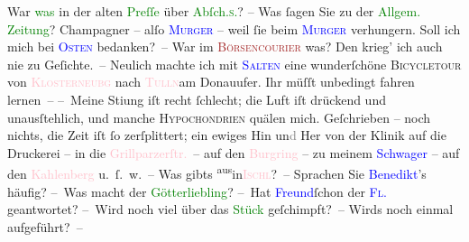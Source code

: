            \pstart
           War \textcolor{green}{was}{} in der alten \textcolor{green}{Preſſe}{}\ledrightnote{\textcolor{green}{Die Presse}} über \textcolor{green}{Abſch.\textsc{s}.}{}\ledrightnote{\textcolor{green}{Abschiedssouper}}? – Was ſagen Sie zu der \textcolor{green}{\textcolor{green}{Allgem. Zeitung}{}\ledrightnote{\textcolor{green}{Wiener Allgemeine Zeitung}}}{}? Champagner – alſo \textcolor{blue}{\textsc{Murger}}{}\ledrightnote{\textcolor{blue}{Henri Murger}} – weil ſie beim \textcolor{blue}{\textsc{Murger}}{}\ledrightnote{\textcolor{blue}{Henri Murger}} verhungern. Soll ich mich bei \textcolor{blue}{\textsc{Osten}}{}\ledrightnote{\textcolor{blue}{Heinrich Osten}} bedanken? – War im \textcolor{brown}{\textsc{Börsencourier}}{}\ledrightnote{\textcolor{brown}{Berliner Börsen-Courier}} was? Den krieg’ ich auch nie zu Geſichte. –\pend
           \pstart
           Neulich machte ich mit \textcolor{blue}{\textsc{Salten}}{}\ledrightnote{\textcolor{blue}{Felix Salten}} eine wunderſchöne \textsc{Bicycletour} von \textcolor{pink}{\textsc{Klosterneubg}}{}\ledrightnote{\textcolor{pink}{Klosterneuburg}} nach \textcolor{pink}{\textsc{Tulln}}{}\ledrightnote{\textcolor{pink}{Tulln an der Donau}}{ }{\pb}am Donauufer. Ihr
               müſſt unbedingt fahren lernen –\pend
           \pstart
           – Meine Sti{\geminationm}ung iſt recht ſchlecht; die Luft iſt
               drückend und unausſtehlich, und manche \textsc{Hypochondrien} quälen
               mich. Geſchrieben – noch nichts, die Zeit iſt ſo zerſplittert; ein ewiges Hin
                  un\textcolor{gray}{d} Her von der Klinik auf die Druckerei – in die \textcolor{pink}{Grillparzerſtr.}{}\ledrightnote{\textcolor{pink}{Grillparzerstraße}} – auf den \textcolor{pink}{Burgring}{}\ledrightnote{\textcolor{pink}{Burgring}} – zu meinem \textcolor{blue}{Schwager}{} – auf den \textcolor{pink}{Kahlenberg}{}\ledrightnote{\textcolor{pink}{Kahlenberg}}
               u. ſ. w. –\pend
           \pstart
           Was gibts \substVorne{}\textsuperscript{aus}\substDazwischen{}in\substHinten{}{ }\textcolor{pink}{\textsc{Ischl}}{}\ledrightnote{\textcolor{pink}{Bad Ischl}}? – Sprachen {\pb}Sie \textcolor{blue}{Benedikt}{}\ledrightnote{\textcolor{blue}{Markus Benedict}{\newline}\textcolor{blue}{Marianne Benedict}}’s häufig? – Was macht der \textcolor{green}{Götterliebling}{}\ledrightnote{\textcolor{green}{Der Tod Georgs}}? – Hat \textcolor{blue}{Freund}{}\ledrightnote{\textcolor{blue}{Carl Freund}}{ }ſchon der \textcolor{blue}{\textsc{Fl.}}{}\ledrightnote{\textcolor{blue}{Bertha Flegmann}} geantwortet? – Wird noch viel über das \textcolor{green}{Stück}{} geſchimpft? – Wirds noch einmal aufgeführt? –

